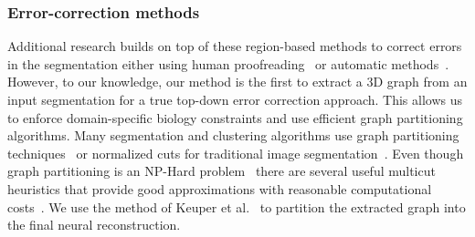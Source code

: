 \subsubsection{Error-correction methods}
Additional research builds on top of these region-based methods to correct errors in the segmentation either using human proofreading~\cite{haehn2014design,haehn2017guided,mojo2} or automatic methods~\cite{rolnick2017morphological,error_correction_using_CNN}.
However, to our knowledge, our method is the first to extract a 3D graph from an input segmentation for a true top-down error correction approach. 
This allows us to enforce domain-specific biology constraints and use efficient graph partitioning algorithms. 
Many segmentation and clustering algorithms use graph partitioning techniques~\cite{andres2012globally} or normalized cuts for traditional image segmentation~\cite{kappes2016higher,shi2000normalized,tatiraju2008image}.
Even though graph partitioning is an NP-Hard problem~\cite{demaine2006correlation} there are several useful multicut heuristics that provide good approximations with reasonable computational costs~\cite{horvnakova2017analysis}. 
We use the method of Keuper et al.~\cite{keuper2015efficient} to partition the extracted graph into the final neural reconstruction.


